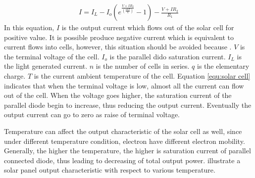 \begin{eqnarray}\label{equ:solar cell}
    I = I_L - I_o(e^{\frac{V+IR_2}{(\frac{nkT}{q})}} - 1) - \frac{V+IR_2}{R_1}
\end{eqnarray}
In this equation, $I$ is the output current which flows out of the solar cell for positive value. It is possible produce negative current which is equivalent to current flows into cells, however, this situation should be avoided because .  $V$ is the terminal voltage of the cell. $I_o$ is the parallel dido saturation current. $I_L$ is the light generated current. $n$ is the number of cells in series. $q$ is the elementary charge. $T$ is the current ambient temperature of the cell. Equation \eqref{equ:solar cell} indicates that when the terminal voltage is low, almost all the current can flow out of the cell. When the voltage goes higher, the saturation current of the parallel diode begin to increase, thus reducing the output current. Eventually the output current can go to zero as raise of terminal voltage. 

Temperature can affect the output characteristic of the solar cell as well, since under different temperature condition, electron have different electron mobility. Generally, the higher the temperature, the higher is saturation current of parallel connected diode, thus leading to decreasing of total output power.  illustrate a solar panel output characteristic with respect to various temperature. 

